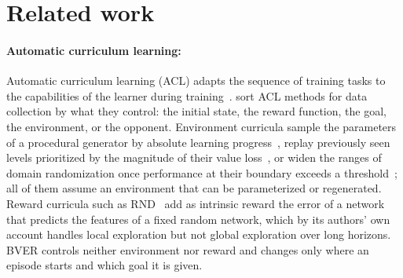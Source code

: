 \section{Related work}\label{sec:related_work}

\paragraph{Automatic curriculum learning:}
Automatic curriculum learning (ACL) adapts the sequence of training tasks to the capabilities of the learner during training~\citep{narvekar2020curriculum, portelas2020automatic}. \citet{portelas2020automatic} sort ACL methods for data collection by what they control: the initial state, the reward function, the goal, the environment, or the opponent. Environment curricula sample the parameters of a procedural generator by absolute learning progress~\citep{portelas2020teacher}, replay previously seen levels prioritized by the magnitude of their value loss~\citep{jiang2021prioritized}, or widen the ranges of domain randomization once performance at their boundary exceeds a threshold~\citep{akkaya2019solving}; all of them assume an environment that can be parameterized or regenerated. Reward curricula such as RND~\citep{burda2018exploration} add as intrinsic reward the error of a network that predicts the features of a fixed random network, which by its authors' own account handles local exploration but not global exploration over long horizons. BVER controls neither environment nor reward and changes only where an episode starts and which goal it is given.

